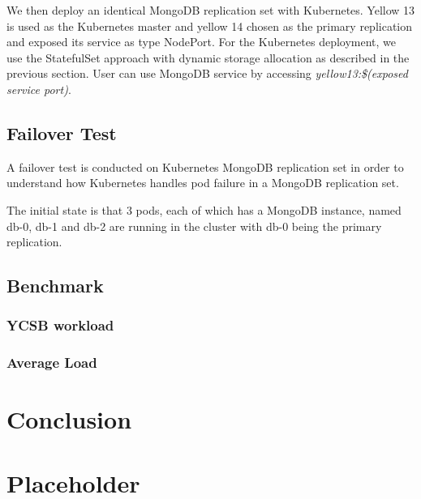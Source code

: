 \documentclass[sigconf]{acmart}
\begin{document}
We then deploy an identical MongoDB replication set with Kubernetes. Yellow 13 is used as the Kubernetes master and yellow 14 chosen as the primary replication and exposed its service as type NodePort. For the Kubernetes deployment, we use the StatefulSet approach with dynamic storage allocation as described in the previous section. User can use MongoDB service by accessing \emph{yellow13:\$(exposed service port)}.

\subsection{Failover Test}
A failover test is conducted on Kubernetes MongoDB replication set in order to understand how Kubernetes handles pod failure in a MongoDB replication set. 

The initial state is that 3 pods, each of which has a MongoDB instance, named db-0, db-1 and db-2 are running in the cluster with db-0 being the primary replication. 

\subsection{Benchmark}
\subsubsection{YCSB workload}
\subsubsection{Average Load }
\section{Conclusion}







\appendix

\section{Placeholder}
\end{document}
